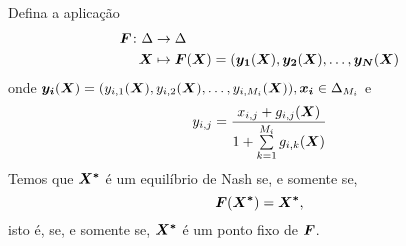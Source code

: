 \begin{theorem}
    Defina a aplicação
    \begin{align*}
        \begin{split}
            \boldsymbol{F} \colon \Delta &\to \Delta\\
            \boldsymbol{X} &\mapsto \boldsymbol{F}(\boldsymbol{X})=(\boldsymbol{y_1}(\boldsymbol{X}),\boldsymbol{y_2}(\boldsymbol{X}),\dots,\boldsymbol{y_N}(\boldsymbol{X})
        \end{split}
    \end{align*}
    onde $\boldsymbol{y_i}(\boldsymbol{X})=(y_{i,1}(\boldsymbol{X}),y_{i,2}(\boldsymbol{X}),\dots,y_{i,M_i}(\boldsymbol{X})),\boldsymbol{x_i}\in\Delta_{M_i}$ e
    \begin{equation*}
        y_{i,j}=\frac{x_{i,j}+g_{i,j}(\boldsymbol{X})}{1+\sum\limits_{k=1}^{M_i}g_{i,k}(\boldsymbol{X})}
    \end{equation*}
    Temos que $\boldsymbol{X^*}$ é um equilíbrio de Nash se, e somente se,
    \begin{equation*}
        \boldsymbol{F}(\boldsymbol{X^*})=\boldsymbol{X^*},
    \end{equation*}
    isto é, se, e somente se, $\boldsymbol{X^*}$ é um ponto fixo de $\boldsymbol{F}$.
\end{theorem}
